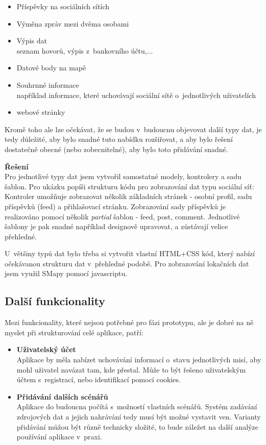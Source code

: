 	\begin{itemize}
		\item Příspěvky na sociálních sítích
		\item Výměna zpráv mezi dvěma osobami
		\item Výpis dat\\
			seznam hovorů, výpis z~bankovního účtu,...
		\item Datové body na mapě
		\item Souhrnné informace\\
			například informace, které uchovávají sociální sítě o~jednotlivých uživatelích
		\item webové stránky
	\end{itemize}

	Kromě toho ale lze očekávat, že se budou v~budoucnu objevovat další typy dat, je tedy důležité, aby bylo snadné tuto nabídku rozšiřovat, a aby bylo řešení dostatečně obecné (nebo zobecnitelné), aby bylo toto přidávání snadné. 

	\textbf{Řešení}\\
	Pro jednotlivé typy dat jsem vytvořil samostatné modely, kontrolery a sadu šablon. Pro ukázku popíši strukturu kódu pro zobrazování dat typu sociální síť:\\
	Kontroler umožňuje zobrazovat několik základních stránek - osobní profil, sadu příspěvků (feed) a přihlašovací stránku.
	Zobrazování sady příspěvků je realizováno pomocí několik \textit{partial} šablon - feed, post, comment. Jednotlivé šablony je pak snadné například designově upravovat, a zůstávají velice přehledné.

	U~většiny typů dat bylo třeba si vytvořit vlastní HTML+CSS kód, který nabízí očekávanou strukturu dat v~přehledné podobě.
	Pro zobrazování lokačních dat jsem využil SMapy pomocí javascriptu.   


\subsection{Další funkcionality}
Mezi funkcionality, které nejsou potřebné pro fázi prototypu, ale je dobré na ně myslet při strukturování celé aplikace, patří:

\begin{itemize}
	\item \textbf{Uživatelský účet}\\
		Aplikace by měla nabízet uchovávání informací o~stavu jednotlivých misí, aby mohl uživatel navázat tam, kde přestal.
		Může to být řešeno uživatelským účtem s~registrací, nebo identifikací pomocí cookies.

	\item \textbf{Přidávání dalších scénářů}\\
		Aplikace do budoucna počítá s~možností vlastních scénářů. Systém zadávání zdrojových dat a jejich nahrávání tedy musí být možné vystavit ven.
		Varianty přidávání můžou být různě technicky složité, to bude záležet na další analýze používání aplikace v~praxi.		


\end{itemize} 

